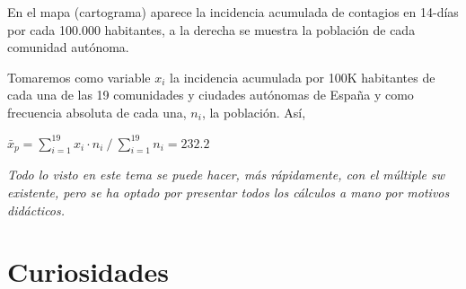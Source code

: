 En el mapa (cartograma) aparece la incidencia acumulada de contagios en 14-días por cada 100.000 habitantes, a la derecha se muestra la población de cada comunidad autónoma.

Tomaremos como variable $x_i$ la incidencia acumulada por 100K habitantes de cada una de las 19 comunidades y ciudades autónomas de España y como frecuencia absoluta de cada una, $n_i$, la población. Así,

$\bar x_p=\displaystyle \sum_{i=1}^{19} x_i \cdot n_i \ / \  \sum_{i=1}^{19} n_i = 232.2$

\begin{destacado}
\emph{Todo lo visto en este tema se puede hacer, más rápidamente, con el múltiple sw existente, pero se ha optado por presentar todos los cálculos a mano por motivos didácticos.}
\end{destacado}




\section{Curiosidades}

